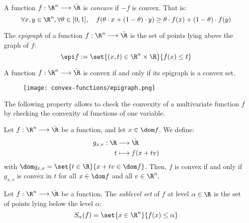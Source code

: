\begin{definition}
    A function $f:\R^n\longrightarrow\bar{\R}$ is \emph{concave} if $-f$ is convex. That is:
    \begin{equation*}
        \forall x,y\in\R^n, \forall\theta\in[0,1], \quad f(\theta\cdot x + (1-\theta)\cdot y) \geq \theta\cdot f(x) + (1-\theta)\cdot f(y)
    \end{equation*}
\end{definition}

\begin{definition}[Epigraph]
    The \emph{epigraph} of a function $f:\R^n\longrightarrow\bar{\R}$ is the set of points lying above the graph of $f$:
    \begin{equation*}
        \epi f := \set{(x, t)\in\R^n\times\R}{f(x)\leq t}
    \end{equation*}
\end{definition}

\begin{property}
    A function $f:\R^n\longrightarrow\bar{\R}$ is convex if and only if its epigraph is a convex set.

    \begin{figure}[H]
        \centering
        \texttt{[image: convex-functions/epigraph.png]}
    \end{figure}
\end{property}

The following property allows to check the convexity of a multivariate function $f$ by checking the convexity of functions of one variable.
\begin{property}
    Let $f:\R^n\longrightarrow\bar{\R}$ be a function, and let $x\in\dom f$. We define:
    \begin{equation*}
        \begin{aligned}
            g_{x,v} : \R &\longrightarrow \bar{\R} \\
            t &\longmapsto f(x+tv)
        \end{aligned}
    \end{equation*}
    with $\dom g_{x,v} = \set{t\in\R}{x+tv\in\dom f}$. Then, $f$ is convex if and only if $g_{x,v}$ is convex in $t$ for all $x\in\dom f$ and all $v\in\R^n$.
\end{property}

\begin{definition}
    Let $f:\R^n\longrightarrow\bar{\R}$ be a function. The \emph{sublevel set} of $f$ at level $\alpha\in\R$ is the set of points lying below the level $\alpha$:
    \begin{equation*}
        S_\alpha(f) = \set{x\in\R^n}{f(x)\leq\alpha}
    \end{equation*}
\end{definition}

